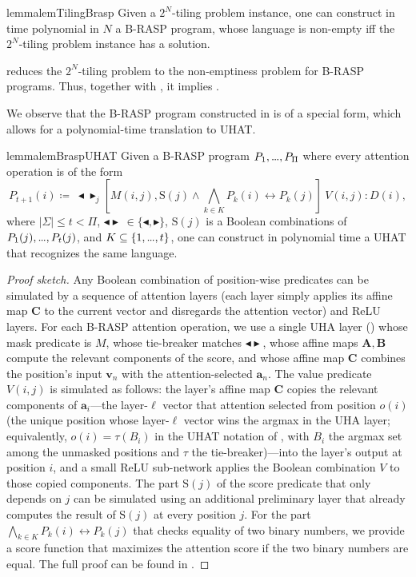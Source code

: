 \documentclass{article} %
\newcommand{\revisedA}[1]{#1}
\newcommand{\minatt}{\blacktriangleleft}
\newcommand{\maxatt}{\blacktriangleright}
\newcommand{\minmaxatt}{\minatt\!\maxatt}
\newcommand{\score}{\mathrm{S}}
\newcommand{\matA}{\boldsymbol{A}}
\newcommand{\matB}{\boldsymbol{B}}
\newcommand{\matC}{\boldsymbol{C}}
\newcommand{\veca}{\boldsymbol{a}}
\newcommand{\bnfdef}{\coloneqq}
\newcommand{\alphabet}{\Sigma}
\newcommand{\bv}{\boldsymbol{v}}
\newcommand{\mydots}{%
  \ifmmode
    \mathord{.}\mkern-1mu\mathord{.}\mkern-1mu\mathord{.}%
  \else
    .\kern-0.1em.\kern-0.1em.%
  \fi
}
\renewcommand{\ldots}{\mydots}%
\renewcommand{\dots}{\mydots}%
\begin{document}
\begin{restatable}[]{lemma}{lemTilingBrasp}\label{lem:tiling-brasp}
\revisedA{Given a $2^N$-tiling problem instance, one can construct in time polynomial in $N$ a B-RASP program,
whose language is non-empty iff the $2^N$-tiling problem instance has a solution.}
\end{restatable}

 reduces the $2^N$-tiling problem to the non-emptiness problem for B-RASP programs.
Thus, together with , it implies .

We observe that the B-RASP program constructed in  is of a special form,
which allows for a polynomial-time translation to UHAT.

\begin{restatable}[]{lemma}{lemBraspUHAT}\label{lem:brasp-uhat}
Given a B-RASP program $P_1,\ldots,P_\Pi$ where every attention operation is of the form
\begin{equation}
P_{t+1}(i) \bnfdef\ \minmaxatt_j [M(i,j),  \score(j) \wedge \bigwedge_{k \in K} P_k(i) \leftrightarrow P_k(j)]\ V(i,j) : D(i),
\end{equation}
where
$|\alphabet| \le t < \Pi$, $\minmaxatt\ \in \{\minatt,\maxatt\}$, $\score(j)$ is a Boolean combinations of $P_1(j),\ldots,P_t(j)$, and $K \subseteq \{1,\dots,t\}$,
one can construct in polynomial time a UHAT that recognizes the same language.
\end{restatable}
\begin{proof}[Proof sketch]
Any Boolean combination of position-wise predicates can be simulated by a sequence of attention layers (each layer simply applies its affine map $\matC$ to the current vector and disregards the attention vector) and ReLU layers.
For each B-RASP attention operation, we use a single UHA layer () whose mask predicate is $M$, whose tie-breaker matches $\minmaxatt$, whose affine maps $\matA, \matB$ compute the relevant components of the score, and whose affine map $\matC$ combines the position's input $\bv_n$ with the attention-selected $\veca_n$.
The value predicate $V(i,j)$ is simulated as follows: the layer's affine map $\matC$ copies the relevant components of $\veca_i$---the layer-$\ell$ vector that attention selected from position $o(i)$ (the unique position whose layer-$\ell$ vector wins the argmax in the UHA layer; equivalently, $o(i) = \tau(B_i)$ in the UHAT notation of , with $B_i$ the argmax set among the unmasked positions and $\tau$ the tie-breaker)---into the layer's output at position $i$, and a small ReLU sub-network applies the Boolean combination $V$ to those copied components.
The part $\score(j)$ of the score predicate that only depends on $j$
can be simulated using an additional preliminary layer that already computes the result of $\score(j)$ at every position $j$.
For the part $\bigwedge_{k \in K} P_k(i) \leftrightarrow P_k(j)$ that checks equality of two binary numbers,
we provide a score function that maximizes the attention score if the two binary numbers are equal.
The full proof can be found in .
\end{proof}
\end{document}
